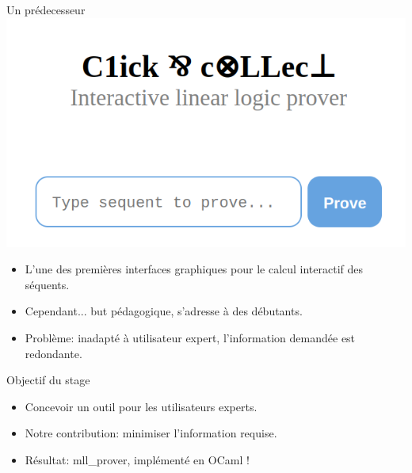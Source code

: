 \documentclass{beamer}
\begin{document}
\begin{frame}{Un prédecesseur}
    \centering
    \includegraphics[scale=0.35]{Click_and_collect.png}

    \pause
    
    \begin{itemize}
        \item L'une des premières interfaces graphiques pour le calcul interactif des séquents.
            \pause
        \item Cependant... \pause but pédagogique, s'adresse à des débutants.
            \pause
        \item Problème: \pause inadapté à utilisateur expert, \pause l'information demandée est redondante.
    \end{itemize}
\end{frame}

\begin{frame}{Objectif du stage}
    \begin{itemize}
        \item Concevoir un outil pour les utilisateurs experts.
            \pause
        \item Notre contribution: \pause minimiser l'information requise.
            \pause
        \item Résultat: \pause mll\_prover, implémenté en OCaml !
    \end{itemize}
\end{frame}
\end{document}
